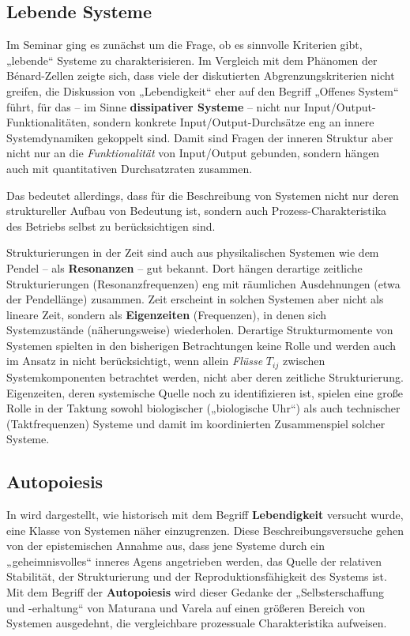 \documentclass[11pt,a4paper]{article}
\begin{document}
\subsection{Lebende Systeme}

Im Seminar ging es zunächst um die Frage, ob es sinnvolle Kriterien gibt,
„lebende“ Systeme zu charakterisieren. Im Vergleich mit dem Phänomen der
Bénard-Zellen zeigte sich, dass viele der diskutierten Abgrenzungskriterien
nicht greifen, die Diskussion von „Lebendigkeit“ eher auf den Begriff „Offenes
System“ führt, für das -- im Sinne \textbf{dissipativer Systeme} -- nicht nur
Input/Output-Funktionalitäten, sondern konkrete Input/Output-Durchsätze eng an
innere Systemdynamiken gekoppelt sind. Damit sind Fragen der inneren Struktur
aber nicht nur an die \emph{Funktionalität} von Input/Output gebunden, sondern
hängen auch mit quantitativen Durchsatzraten zusammen.

Das bedeutet allerdings, dass für die Beschreibung von Systemen nicht nur
deren struktureller Aufbau von Bedeutung ist, sondern auch
Prozess-Charakteristika des Betriebs selbst zu berücksichtigen sind.

Strukturierungen in der Zeit sind auch aus physikalischen Systemen wie dem
Pendel -- als \textbf{Resonanzen} -- gut bekannt. Dort hängen derartige
zeitliche Strukturierungen (Resonanzfrequenzen) eng mit räumlichen
Ausdehnungen (etwa der Pendellänge) zusammen. Zeit erscheint in solchen
Systemen aber nicht als lineare Zeit, sondern als \textbf{Eigenzeiten}
(Frequenzen), in denen sich Systemzustände (näherungsweise)
wiederholen. Derartige Strukturmomente von Systemen spielten in den bisherigen
Betrachtungen keine Rolle und werden auch im Ansatz in \cite{Ulanowicz2009}
nicht berücksichtigt, wenn allein \emph{Flüsse} $T_{ij}$ zwischen
Systemkomponenten betrachtet werden, nicht aber deren zeitliche
Strukturierung.  Eigenzeiten, deren systemische Quelle noch zu identifizieren
ist, spielen eine große Rolle in der Taktung sowohl biologischer („biologische
Uhr“) als auch technischer (Taktfrequenzen) Systeme und damit im koordinierten
Zusammenspiel solcher Systeme.

\subsection{Autopoiesis}

In \cite{Mingers1989} wird dargestellt, wie historisch mit dem Begriff
\textbf{Lebendigkeit} versucht wurde, eine Klasse von Systemen näher
einzugrenzen. Diese Beschreibungsversuche gehen von der epistemischen Annahme
aus, dass jene Systeme durch ein „geheimnisvolles“ inneres Agens angetrieben
werden, das Quelle der relativen Stabilität, der Strukturierung und der
Reproduktionsfähigkeit des Systems ist. Mit dem Begriff der
\textbf{Autopoiesis} wird dieser Gedanke der „Selbsterschaffung und
-erhaltung“ von Maturana und Varela auf einen größeren Bereich von Systemen
ausgedehnt, die vergleichbare prozessuale Charakteristika aufweisen.
\end{document}
